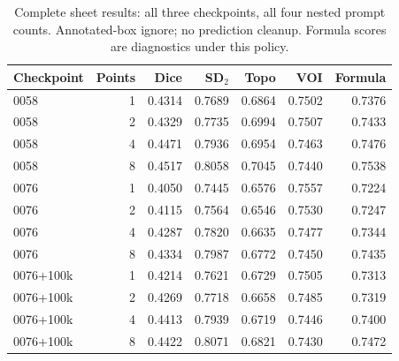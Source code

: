 \begin{table}[t]
\centering
\small
\setlength{\tabcolsep}{4pt}
\begin{tabular}{lrrrrrr}
\toprule
Checkpoint & Points & Dice & SD$_2$ & Topo & VOI & Formula \\
\midrule
0058 & 1 & 0.4314 & 0.7689 & 0.6864 & 0.7502 & 0.7376 \\
0058 & 2 & 0.4329 & 0.7735 & 0.6994 & 0.7507 & 0.7433 \\
0058 & 4 & 0.4471 & 0.7936 & 0.6954 & 0.7463 & 0.7476 \\
0058 & 8 & 0.4517 & 0.8058 & 0.7045 & 0.7440 & 0.7538 \\
0076 & 1 & 0.4050 & 0.7445 & 0.6576 & 0.7557 & 0.7224 \\
0076 & 2 & 0.4115 & 0.7564 & 0.6546 & 0.7530 & 0.7247 \\
0076 & 4 & 0.4287 & 0.7820 & 0.6635 & 0.7477 & 0.7344 \\
0076 & 8 & 0.4334 & 0.7987 & 0.6772 & 0.7450 & 0.7435 \\
0076+100k & 1 & 0.4214 & 0.7621 & 0.6729 & 0.7505 & 0.7313 \\
0076+100k & 2 & 0.4269 & 0.7718 & 0.6658 & 0.7485 & 0.7319 \\
0076+100k & 4 & 0.4413 & 0.7939 & 0.6719 & 0.7446 & 0.7400 \\
0076+100k & 8 & 0.4422 & 0.8071 & 0.6821 & 0.7430 & 0.7472 \\
\bottomrule
\end{tabular}
\caption{Complete sheet results: all three checkpoints, all four nested prompt counts. Annotated-box ignore; no prediction cleanup. Formula scores are diagnostics under this policy.}
\label{tab:promptmatrix}
\end{table}
